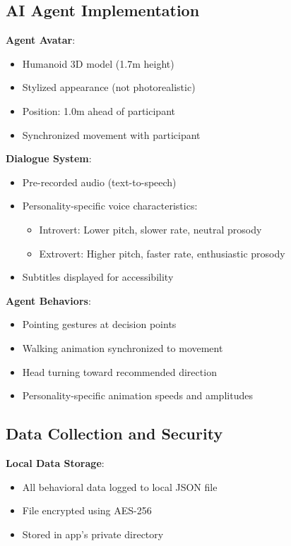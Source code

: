 \documentclass[12pt]{article}
\begin{document}
\subsection{AI Agent Implementation}

\textbf{Agent Avatar}:
\begin{itemize}
    \item Humanoid 3D model (1.7m height)
    \item Stylized appearance (not photorealistic)
    \item Position: 1.0m ahead of participant
    \item Synchronized movement with participant
\end{itemize}

\textbf{Dialogue System}:
\begin{itemize}
    \item Pre-recorded audio (text-to-speech)
    \item Personality-specific voice characteristics:
    \begin{itemize}
        \item Introvert: Lower pitch, slower rate, neutral prosody
        \item Extrovert: Higher pitch, faster rate, enthusiastic prosody
    \end{itemize}
    \item Subtitles displayed for accessibility
\end{itemize}

\textbf{Agent Behaviors}:
\begin{itemize}
    \item Pointing gestures at decision points
    \item Walking animation synchronized to movement
    \item Head turning toward recommended direction
    \item Personality-specific animation speeds and amplitudes
\end{itemize}

\subsection{Data Collection and Security}

\textbf{Local Data Storage}:
\begin{itemize}
    \item All behavioral data logged to local JSON file
    \item File encrypted using AES-256
    \item Stored in app's private directory
\end{itemize}
\end{document}
